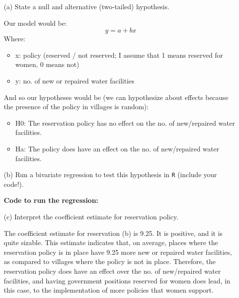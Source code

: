 \documentclass[12pt,letterpaper]{article}
\begin{document}
\newpage
\begin{enumerate}
	\item [(a)] State a null and alternative (two-tailed) hypothesis. 
	\vspace{.5cm}
	
	Our model would be: 
	\begin{equation}
		y = a + bx
	\end{equation}
	Where: 
		\begin{itemize}
		\item x: policy (reserved / not reserved; I assume that 1 means reserved for women, 0 means not)
		\item y:  no. of new or repaired water facilities 
	\end{itemize}
	And so our hypotheses would be (we can hypothesize about effects because the presence of the policy in villages is random): 
	\begin{itemize}
		\item H0: The reservation policy has no effect on the no. of new/repaired water facilities.
		\item Ha: The policy does have an effect on the no. of new/repaired water facilities. 
	\end{itemize}
		
	\item [(b)] Run a bivariate regression to test this hypothesis in \texttt{R} (include your code!).
	\vspace{.5cm}
	
	\noindent \textbf {Code to run the regression:}
	
	
	\item [(c)] Interpret the coefficient estimate for reservation policy. 
	\vspace{.5cm}
	
	The coefficient estimate for reservation (b) is 9.25. It is positive, and it is quite sizable. This estimate indicates that, on average, places where the reservation policy is in place have 9.25 more new or repaired water facilities, as compared to villages where the policy is not in place. Therefore, the reservation policy does have an effect over the no. of new/repaired water facilities, and having government positions reserved for women does lead, in this case, to the implementation of more policies that women support. 
	
\end{enumerate}
\end{document}
